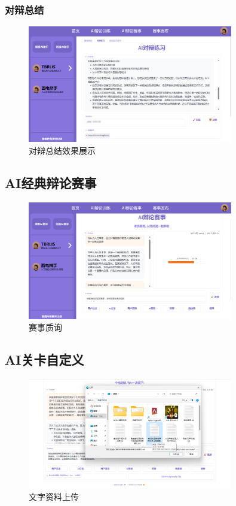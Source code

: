 \documentclass[a4paper,]{article}
\newcommand{\xiaosihao}{\fontsize{12pt}{\baselineskip}\selectfont}
\newcommand{\zw}{\setlength{\baselineskip}{1.5em}\xiaosihao}
\begin{document}
    
        
        \subsubsection{对辩总结}
         \begin{figure}[H]
        	\centering
        	\includegraphics[width=0.8\textwidth,height=0.4\textwidth]{AI对辩总结.png}
        	\caption{对辩总结效果展示}
        \end{figure} 
        
        \subsection{AI经典辩论赛事}
        \zw{在AI辩论赛事部分，我们展现了全流程的辩论能力。}
          \begin{figure}[H]
        	\centering
        	\includegraphics[width=0.8\textwidth,height=0.4\textwidth]{AI赛事质询.png}
        	\caption{赛事质询}
        \end{figure} 
        
        \subsection{AI关卡自定义}
        \zw{在AI关卡自定义部分，我们上传了一份辩论文字资料，随后AI辩手的回答与论点就会高度运用上文字资料的内容。}
          \begin{figure}[H]
        	\centering
        	\includegraphics[width=0.8\textwidth,height=0.4\textwidth]{AI自定义上传.png}
        	\caption{文字资料上传}
        \end{figure} 
   
\end{document}
